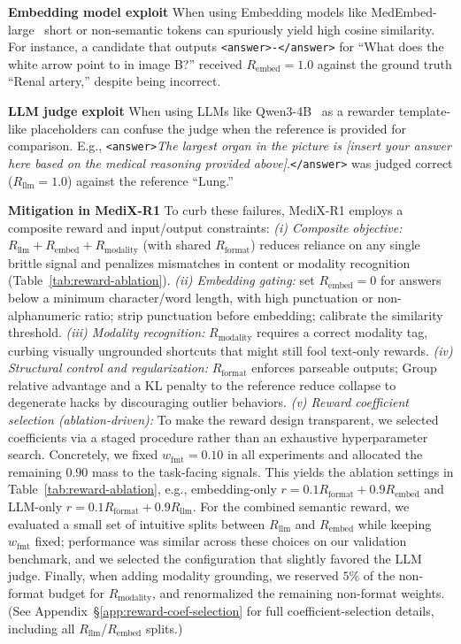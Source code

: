 \documentclass{article}
\theoremstyle{plain}
\theoremstyle{definition}
\theoremstyle{remark}
\begin{document}
\noindent\textbf{Embedding model exploit} When using Embedding models like MedEmbed-large~\citep{balachandran2024medembed}
short or non-semantic tokens can spuriously yield high cosine similarity. For instance, a candidate that outputs {\footnotesize\texttt{<answer>-</answer>}} for
``What does the white arrow point to in image B?'' received $R_{\text{embed}}{=}1.0$ against the ground truth ``Renal artery,'' despite being incorrect.

\noindent\textbf{LLM judge exploit} When using LLMs like Qwen3-4B~\citep{qwen3technicalreport} as a rewarder template-like placeholders can confuse the judge when the reference is provided for comparison. E.g., {\footnotesize\texttt{<answer>}}\textit{The largest organ in the picture is [insert your answer here based on the medical reasoning provided above]}.{\footnotesize\texttt{</answer>}} was judged correct ($R_{\text{llm}}{=}1.0$) against the reference ``Lung.''

\noindent\textbf{Mitigation in MediX-R1}
To curb these failures, MediX-R1 employs a composite reward and input/output constraints:
\textit{(i) Composite objective:} $R_{\text{llm}} + R_{\text{embed}} + R_{\text{modality}}$ (with shared $R_{\text{format}}$) reduces reliance on any single brittle signal and penalizes mismatches in content or modality recognition (Table~\ref{tab:reward-ablation}).
\textit{(ii) Embedding gating:} set $R_{\text{embed}}{=}0$ for answers below a minimum character/word length, with high punctuation or non-alphanumeric ratio; strip punctuation before embedding; calibrate the similarity threshold.
\textit{(iii) Modality recognition: }$R_{\text{modality}}$ requires a correct modality tag, curbing visually ungrounded shortcuts that might still fool text-only rewards. 
\textit{(iv) Structural control and regularization:} $R_{\text{format}}$ enforces parseable outputs; Group relative advantage and a KL penalty to the reference reduce collapse to degenerate hacks by discouraging outlier behaviors.
\textit{(v) Reward coefficient selection (ablation-driven):} To make the reward design transparent, we selected coefficients via a staged procedure rather than an exhaustive hyperparameter search. Concretely, we fixed $w_{\text{fmt}}{=}0.10$ in all experiments and allocated the remaining $0.90$ mass to the task-facing signals. This yields the ablation settings in Table~\ref{tab:reward-ablation}, e.g., embedding-only $r=0.1R_{\text{format}}+0.9R_{\text{embed}}$ and LLM-only $r=0.1R_{\text{format}}+0.9R_{\text{llm}}$. For the combined semantic reward, we evaluated a small set of intuitive splits between $R_{\text{llm}}$ and $R_{\text{embed}}$ while keeping $w_{\text{fmt}}$ fixed; performance was similar across these choices on our validation benchmark, and we selected the configuration that slightly favored the LLM judge. Finally, when adding modality grounding, we reserved $5\%$ of the non-format budget for $R_{\text{modality}}$, and renormalized the remaining non-format weights. (See Appendix~\S\ref{app:reward-coef-selection} for full coefficient-selection details, including all $R_{\text{llm}}$/$R_{\text{embed}}$ splits.)
\end{document}
